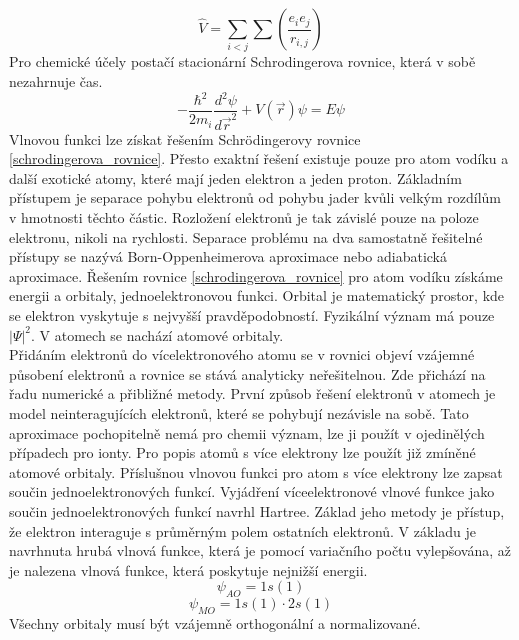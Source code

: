 \documentclass[
  digital, %
  table,   %
  lof,     %
  lot,     %
]{fithesis3}
\begin{document}
\begin{equation}
\widehat{V} = \sum_{i<j}\sum \left( \frac{e_i e_j}{r_{i,j}}\right)
\end{equation}
 Pro chemické účely postačí stacionární Schrodingerova rovnice, která v sobě nezahrnuje čas.
\begin{equation}
-\frac{\hbar^2}{2m_i} \frac{d^2 \psi}{d\vec{r} ^2} + V(\vec{r}) \psi = E \psi
\label{schrodingerova_rovnice}
\end{equation}
Vlnovou funkci lze získat řešením Schrödingerovy rovnice \ref{schrodingerova_rovnice}. Přesto exaktní řešení existuje pouze pro atom vodíku a další exotické atomy, které mají jeden elektron a jeden proton. Základním přístupem je separace pohybu elektronů od pohybu jader kvůli velkým rozdílům v hmotnosti těchto částic. Rozložení elektronů je tak závislé pouze na poloze elektronu, nikoli na rychlosti. Separace problému na dva samostatně řešitelné přístupy se nazývá Born-Oppenheimerova aproximace nebo adiabatická aproximace. \cite{warren1986ab}
Řešením rovnice \ref{schrodingerova_rovnice} pro atom vodíku získáme energii a orbitaly, jednoelektronovou funkci. Orbital je matematický prostor, kde se elektron vyskytuje s nejvyšší pravděpodobností. Fyzikální význam má pouze $|\Psi|^{2}$. V atomech se nachází atomové orbitaly. \\
Přidáním elektronů do vícelektronového atomu se v rovnici objeví vzájemné působení elektronů a rovnice se stává analyticky neřešitelnou. Zde přichází na řadu numerické a přibližné metody. První způsob řešení elektronů v atomech je model neinteragujících elektronů, které se pohybují nezávisle na sobě. Tato aproximace pochopitelně nemá pro chemii význam, lze ji použít v ojedinělých případech pro ionty. Pro popis atomů s více elektrony lze použít již zmíněné atomové orbitaly. Příslušnou vlnovou funkci pro atom s více elektrony lze zapsat součin jednoelektronových funkcí. Vyjádření víceelektronové vlnové funkce jako součin jednoelektronových funkcí navrhl Hartree. Základ jeho metody je přístup, že elektron interaguje s průměrným polem ostatních elektronů. V základu je navrhnuta hrubá vlnová funkce, která je pomocí variačního počtu vylepšována, až je nalezena vlnová funkce, která poskytuje nejnižší energii.
\begin{equation}
\psi_{AO} = 1s(1)
\end{equation}
\begin{equation}
\psi_{MO} = 1s(1) \cdot 2s(1)
\end{equation} 
Všechny orbitaly musí být vzájemně orthogonální a normalizované.
\end{document}
